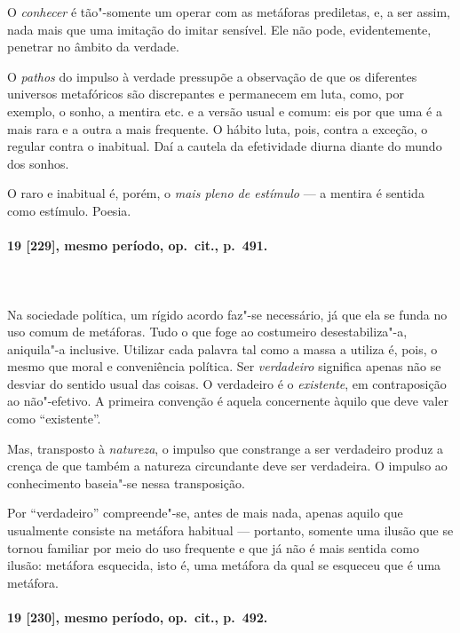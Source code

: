 O \textit{conhecer} é tão"-somente um operar com as metáforas prediletas, e,
a ser assim, nada mais que uma imitação do imitar sensível. Ele não
pode, evidentemente, penetrar no âmbito da verdade.

O \textit{pathos} do impulso à verdade pressupõe a observação de que os
diferentes universos metafóricos são discrepantes e permanecem em luta,
como, por exemplo, o sonho, a mentira etc. e a versão usual e comum:
eis por que uma é a mais rara e a outra a mais frequente. O hábito
luta, pois, contra a exceção, o regular contra o inabitual. Daí a
cautela da efetividade diurna diante do mundo dos sonhos. 

O raro e inabitual é, porém, o \textit{mais pleno de estímulo} --- a
mentira é sentida como estímulo. Poesia. 

\pagebreak
\paragraph*{19 [229], mesmo período, op.~cit., p.~491.}
\ \\
\ \\

Na sociedade política, um rígido acordo faz"-se necessário, já que ela
se funda no uso comum de metáforas. Tudo o que foge ao costumeiro
desestabiliza"-a, aniquila"-a inclusive. Utilizar cada palavra tal
como a massa a utiliza é, pois, o mesmo que moral e conveniência
política. Ser \textit{verdadeiro} significa apenas não se desviar do
sentido usual das coisas. O verdadeiro é o \textit{existente}, em
contraposição ao não"-efetivo. A primeira convenção é aquela
concernente àquilo que deve valer como “existente”.

Mas, transposto à \textit{natureza}, o impulso que constrange a ser
verdadeiro produz a crença de que também a natureza circundante deve
ser verdadeira. O impulso ao conhecimento baseia"-se nessa
transposição.

Por “verdadeiro” compreende"-se, antes de mais nada, apenas aquilo que
usualmente consiste na metáfora habitual --- portanto, somente uma ilusão
que se tornou familiar por meio do uso frequente e que já não é mais
sentida como ilusão: metáfora esquecida, isto é, uma metáfora da qual
se esqueceu que é uma metáfora.

\pagebreak
\paragraph*{19 [230], mesmo período, op.~cit., p.~492.}
\ \\
\ \\

